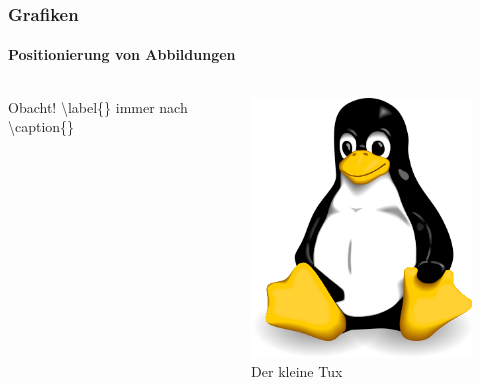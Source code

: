 
\begin{frame}
\frametitle{Grafiken}
\framesubtitle{Positionierung von Abbildungen}
\begin{columns}
\begin{column}{.5\textwidth}
{\ttfamily {\footnotesize
}}

\begin{alertblock}{Obacht!}
\color{nounibaredI}\textbackslash label\color{black}\{\} immer nach \color{nounibaredI}\textbackslash caption\color{black}\{\}
\end{alertblock}
\end{column}

\begin{column}{.5\textwidth} 
\begin{figure}
\begin{center}
    \includegraphics[width=\textwidth]{image/tux.png}
\caption{Der kleine Tux}
\label{img:kleinertux}
\end{center}
\end{figure}
\end{column}
\end{columns}
\end{frame}

